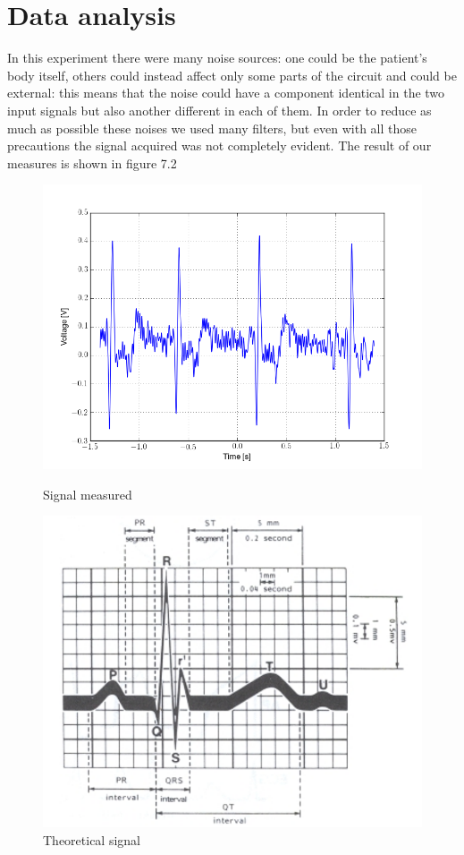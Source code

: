 \section{Data analysis}
In this experiment there were many noise sources: one could be the patient's body itself, others could instead affect only some parts of the circuit and could be external: this means that the noise could have a component identical in the two input signals but also another different in each of them.
In order to reduce as much as possible these noises we used many filters, but even with all those precautions the signal acquired was not completely evident. The result of our measures is shown in figure 7.2
\begin{figure}[H]
\begin{minipage}{.5\textwidth}
\centering
\includegraphics[width=\textwidth]{8/ecg.png}
\caption{Signal measured}
\end{minipage}%
\begin{minipage}{.5\textwidth}
\centering
\includegraphics[width=\textwidth]{8/theo.png}
\caption{Theoretical signal}
\end{minipage}
\end{figure}
